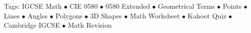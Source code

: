\documentclass[11pt,a4paper]{article}
\begin{document}
\vspace{14pt}
\begin{center}
  \sffamily\scriptsize\textcolor{textmuted}{
    Tags: IGCSE Math $\bullet$ CIE 0580 $\bullet$ 0580 Extended $\bullet$ Geometrical Terms $\bullet$ Points $\bullet$ Lines $\bullet$ Angles $\bullet$ Polygons $\bullet$ 3D Shapes $\bullet$ Math Worksheet $\bullet$ Kahoot Quiz $\bullet$ Cambridge IGCSE $\bullet$ Math Revision
  }
\end{center}
\end{document}
